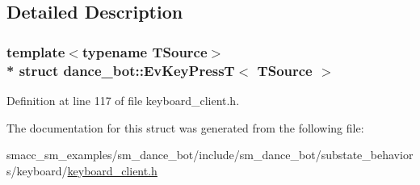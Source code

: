 \subsection{Detailed Description}
\subsubsection*{template$<$typename T\+Source$>$\\*
struct dance\+\_\+bot\+::\+Ev\+Key\+Press\+T$<$ T\+Source $>$}



Definition at line 117 of file keyboard\+\_\+client.\+h.



The documentation for this struct was generated from the following file\+:\begin{DoxyCompactItemize}
\item 
smacc\+\_\+sm\+\_\+examples/sm\+\_\+dance\+\_\+bot/include/sm\+\_\+dance\+\_\+bot/substate\+\_\+behaviors/keyboard/\hyperlink{keyboard__client_8h}{keyboard\+\_\+client.\+h}\end{DoxyCompactItemize}
